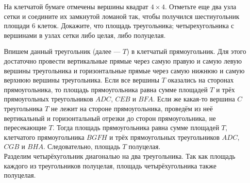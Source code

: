 \documentclass[a4paper,12pt]{article}
\begin{document}
    \problem На клетчатой бумаге отмечены вершины квадрат $4 \times 4$. Отметьте еще два узла сетки и соедините их замкнутой ломаной так, чтобы получился шестиугольник площади 6 клеток.
    \problemw Докажите, что площадь \sub треугольника; \sub четырехугольника с вершинами в узлах сетки либо целая, либо полуцелая.
    \begin{solution}
        \sub Впишем данный треугольник (далее --- $T$) в клетчатый прямоугольник. Для этого достаточно провести вертикальные прямые через самую правую и самую левую вершины треугольника и горизонтальные прямые через самую нижнюю и самую верхнюю вершины треугольника. Если все вершины $T$ оказались на сторонах прямоугольника, то площадь прямоугольника равна сумме площадей $T$ и трёх прямоугольных треугольников $ADC$, $CEB$ и $BFA$. Если же какая-то вершина $C$ треугольника $T$ не лежит на стороне прямоугольника, проведём из неё вертикальный и горизонтальный отрезки до сторон прямоугольника, не пересекающие $T$. Тогда площадь прямоугольника равна сумме площадей $T$, клетчатого прямоугольника $BGFH$ и трёх прямоугольных треугольников $ADC$, $CGB$ и $BHA$. Следовательно, площадь $T$ полуцелая. \\
        \sub Разделим четырёхугольник диагональю на два треугольника. Так как площадь каждого из треугольников полуцелая, площадь четырёхугольника также полуцелая.
        \begin{center}
\end{center}
\end{solution}
\end{document}
